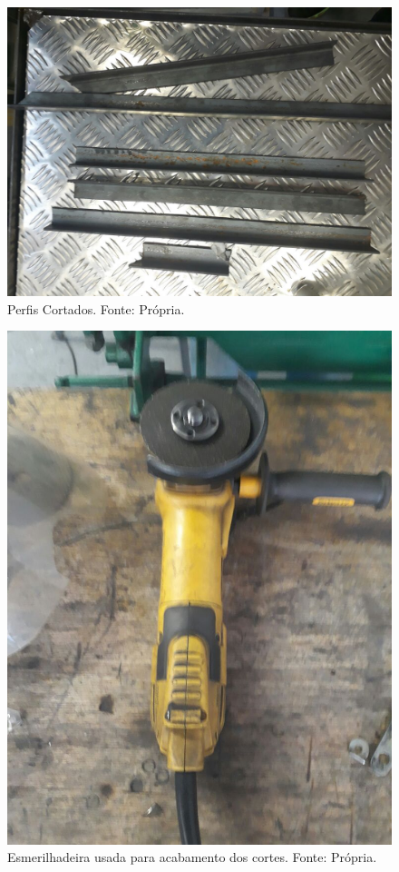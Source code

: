   \begin{figure}[H]
    \centering
    \includegraphics[scale= 0.3]{figuras/estrutura/perfis-cortados.jpg}
    \caption{Perfis Cortados. Fonte: Própria.}
    \label{modelagem}
  \end{figure}

  \begin{figure}[H]
    \centering
    \includegraphics[scale= 0.3]{figuras/estrutura/esmerilhadeira.jpg}
    \caption{Esmerilhadeira usada para acabamento dos cortes. Fonte: Própria.}
    \label{modelagem}
  \end{figure}

